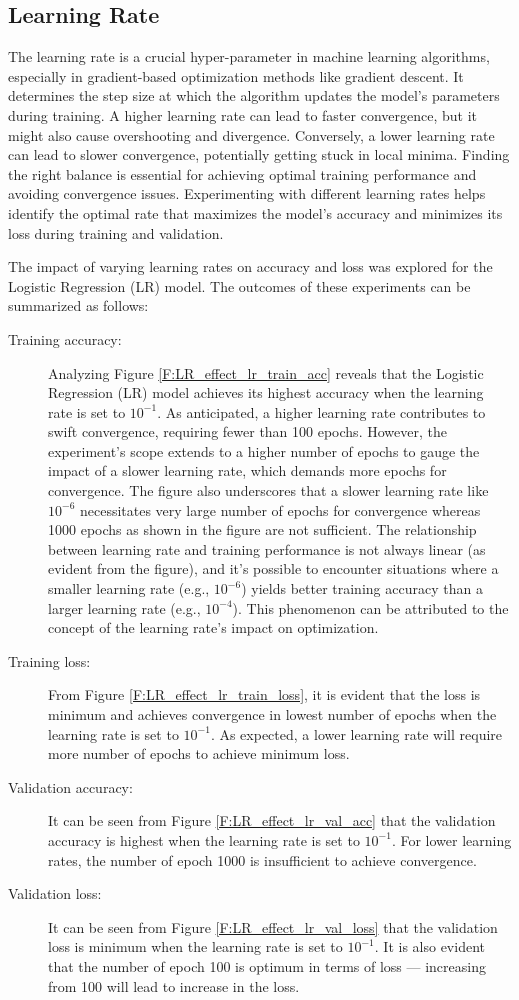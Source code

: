 \documentclass[12pt, a4paper, twoside]{article}
\begin{document}
\subsection{Learning Rate}\label{SS:lr-rate}
The learning rate is a crucial hyper-parameter in machine learning algorithms, especially in gradient-based optimization methods like gradient descent. It determines the step size at which the algorithm updates the model's parameters during training. A higher learning rate can lead to faster convergence, but it might also cause overshooting and divergence. Conversely, a lower learning rate can lead to slower convergence, potentially getting stuck in local minima. Finding the right balance is essential for achieving optimal training performance and avoiding convergence issues. Experimenting with different learning rates helps identify the optimal rate that maximizes the model's accuracy and minimizes its loss during training and validation.
\par
The impact of varying learning rates on accuracy and loss was explored for the Logistic Regression (LR) model. The outcomes of these experiments can be summarized as follows:
\begin{description}
\item[Training accuracy:] Analyzing Figure \ref{F:LR_effect_lr_train_acc} reveals that the Logistic Regression (LR) model achieves its highest accuracy when the learning rate is set to $10^{-1}$. As anticipated, a higher learning rate contributes to swift convergence, requiring fewer than 100 epochs. However, the experiment's scope extends to a higher number of epochs to gauge the impact of a slower learning rate, which demands more epochs for convergence. The figure also underscores that a slower learning rate like $10^{-6}$ necessitates very large number of epochs for convergence whereas 1000 epochs as shown in the figure are not sufficient.  The relationship between learning rate and training performance is not always linear (as evident from the figure), and it's possible to encounter situations where a smaller learning rate (e.g., $10^{-6}$) yields better training accuracy than a larger learning rate (e.g., $10^{-4}$). This phenomenon can be attributed to the concept of the learning rate's impact on optimization.
\item[Training loss:] From Figure \ref{F:LR_effect_lr_train_loss}, it is evident that the loss is minimum and achieves convergence in lowest number of epochs when the learning rate is set to $10^{-1}$. As expected, a lower learning rate will require more number of epochs to achieve minimum loss.
\item[Validation accuracy:] It can be seen from Figure \ref{F:LR_effect_lr_val_acc} that the validation accuracy is highest when the learning rate is set to $10^{-1}$.  For lower learning rates, the number of epoch 1000 is insufficient to achieve convergence.
\item[Validation loss:] It can be seen from Figure \ref{F:LR_effect_lr_val_loss} that the validation loss is minimum when the learning rate is set to $10^{-1}$. It is also evident that the number of epoch 100 is optimum in terms of loss --- increasing from 100 will lead to increase in the loss.
\end{description}
\end{document}
